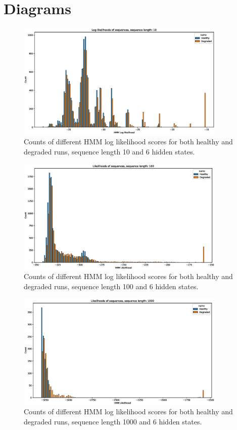 \documentclass[journal]{IEEEtran}
\begin{document}
\appendices

\section{Diagrams}

\begin{figure}[h]
 \centering
 \includegraphics[width=10cm,keepaspectratio=true]{./hmm_histograms_10.eps}
 \caption{Counts of different HMM log likelihood scores for both healthy and degraded runs, sequence length 10 and 6 hidden states.}
 \label{figure:log_likelihood_10}
\end{figure}

\begin{figure}[h]
 \centering
 \includegraphics[width=10cm,keepaspectratio=true]{./hmm_histograms_100.eps}
 \caption{Counts of different HMM log likelihood scores for both healthy and degraded runs, sequence length 100 and 6 hidden states.}
 \label{figure:log_likelihood_100}
\end{figure}

\begin{figure}[h]
 \centering
 \includegraphics[width=10cm,keepaspectratio=true]{./hmm_histograms_1000.eps}
 \caption{Counts of different HMM log likelihood scores for both healthy and degraded runs, sequence length 1000 and 6 hidden states.}
 \label{figure:log_likelihood_1000}
\end{figure}
\end{document}
